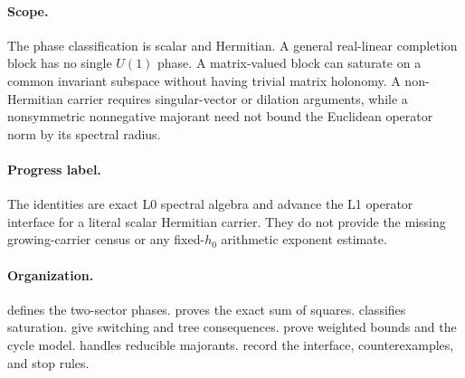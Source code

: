 \paragraph{Scope.}
The phase classification is scalar and Hermitian.  A general
real-linear completion block has no single \(U(1)\) phase.  A
matrix-valued block can saturate on a common invariant subspace without
having trivial matrix holonomy.  A non-Hermitian carrier requires
singular-vector or dilation arguments, while a nonsymmetric
nonnegative majorant need not bound the Euclidean operator norm by its
spectral radius.

\paragraph{Progress label.}
The identities are exact L0 spectral algebra and advance the L1
operator interface for a literal scalar Hermitian carrier.  They do not
provide the missing growing-carrier census or any fixed-\(h_0\)
arithmetic exponent estimate.

\paragraph{Organization.}
 defines the two-sector phases.
 proves the exact sum of squares.
 classifies saturation.
 give switching and tree consequences.
 prove weighted bounds and the cycle
model.   handles reducible majorants.
 record the
interface, counterexamples, and stop rules.

